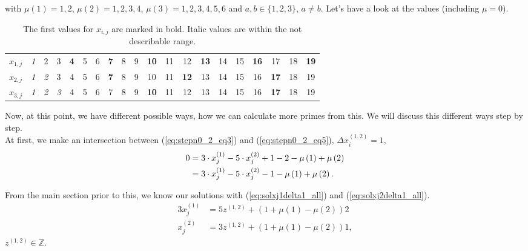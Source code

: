 with $\mu\left(1\right) = 1,2$, $\mu\left(2\right) = 1,2,3,4$, $\mu\left(3\right) = 1,2,3,4,5,6$ and $a,b \in \{1,2,3\}$, $a\neq b$. Let's have a look at the values (including $\mu = 0$).

\begin{table}[H]
\centering
\caption{The first values for $x_{i,j}$ are marked in bold. Italic values are within the not describable range.}
\begin{tabular}{c|ccccccccccccccccccc}
\hline	$x_{1,j}$ & \textit{1} & 2 & 3 & \textbf{4} & 5 & 6 & \textbf{7} & 8 & 9 & \textbf{10} & 11 & 12 & \textbf{13} & 14 & 15 & \textbf{16} & 17 & 18 & \textbf{19} \\
	$x_{2,j}$ & \textit{1} & \textit{2} & 3 & 4 & 5 & 6 & \textbf{7} & 8 & 9 & 10 & 11 & \textbf{12} & 13 & 14 & 15 & 16 & \textbf{17} & 18 & 19 \\
	$x_{3,j}$ & \textit{1} & \textit{2} & \textit{3} & 4 & 5 & 6 & 7 & 8 & 9 & \textbf{10} & 11 & 12 & 13 & 14 & 15 & 16 & \textbf{17} & 18 & 19
\end{tabular}
\label{tab:stepn0_2_values357}
\end{table}

Now, at this point, we have different possible ways, how we can calculate more primes from this. We will discuss this different ways step by step.\\
At first, we make an intersection between (\ref{eq:stepn0_2_eq3}) and (\ref{eq:stepn0_2_eq5}), $\Delta x_{i}^{\left(1,2\right)} = 1$,
\begin{alignat}{3}
	0 &= 3\cdot x_{j}^{\left(1\right)} - 5\cdot x_{j}^{\left(2\right)} + 1 - 2 - \mu\left(1\right)  + \mu\left(2\right) \notag \\
	  &= 3\cdot x_{j}^{\left(1\right)} - 5\cdot x_{j}^{\left(2\right)} - 1 - \mu\left(1\right)  + \mu\left(2\right). \label{eq:step0_2_int35}
\end{alignat}

From the main section prior to this, we know our solutions with (\ref{eq:solxj1delta1_all}) and (\ref{eq:solxj2delta1_all}).
\begin{alignat}{3}
	x_{j}^{\left(1\right)} &= 5z^{\left(1,2\right)} + \left(1 + \mu\left(1\right) - \mu\left(2\right)\right)2 \label{eq:step0_2_sol35_1} \\
	x_{j}^{\left(2\right)} &= 3z^{\left(1,2\right)} + \left(1 + \mu\left(1\right) - \mu\left(2\right)\right)1 \label{eq:step0_2_sol35_2},
\end{alignat}
$z^{\left(1,2\right)} \in \mathbb{Z}$.\\


